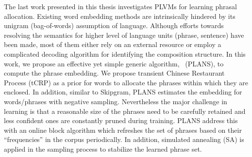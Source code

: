 The last work presented in this thesis investigates PLVMs for learning phrasal
allocation. Existing word embedding methods are intrinsically hindered by its
unigram (bag-of-words) assumption of language. Although efforts towards
resolving the semantics for higher level of language units (\eg phrase,
sentence) have been made, most of them either rely on an external resource or
employ a complicated decoding algorithm for identifying the composition
structure. In this work, we propose an effective yet simple generic algorithm,
\PLANS{}~(PLANS), to compute the phrase embedding. We propose transient Chinese
Restaurant Process (tCRP) as a prior for words to allocate the phrases within
which they are enclosed. In addition, similar to Skipgram, PLANS estimates the
embedding for words/phrases with negative sampling.  Nevertheless the major
challenge in learning is that a reasonable size of the phrases need to be
carefully retained and less confident ones are constantly pruned during
training. PLANS address this with an online block algorithm which refreshes the
set of phrases based on their ``frequencies'' in the corpus periodically. In
addition, simulated annealing (SA) is applied in the sampling process to
stabilize the learned phrase set. %
